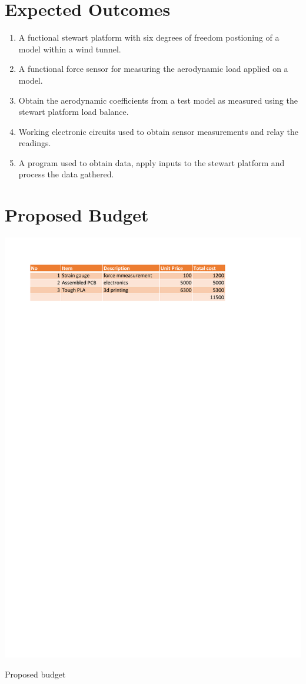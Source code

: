 \section{Expected Outcomes}
\begin{enumerate}
\item A fuctional stewart platform with six degrees of freedom postioning of a model within a wind tunnel.
\item A functional force sensor for measuring the aerodynamic load applied on a model.
\item Obtain the aerodynamic coefficients from a test model as measured using the stewart platform load balance.
\item Working electronic circuits used to obtain sensor measurements and relay the readings.
\item A program used to obtain data, apply inputs to the stewart platform and process the data gathered.
\end{enumerate}
\newpage
\section{Proposed Budget}
\begin{table}[!h]
\includegraphics{Figures/budget}
\caption{Proposed budget}
\end{table}
